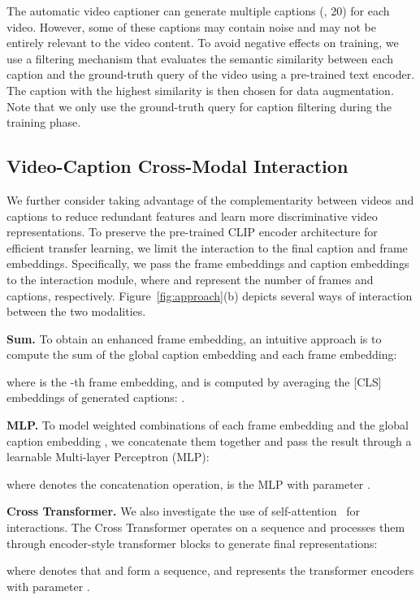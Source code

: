 \documentclass[10pt,twocolumn,letterpaper]{article}
\begin{document}
The automatic video captioner can generate multiple captions (\eg, 20) for each video. However, some of these captions may contain noise and may not be entirely relevant to the video content. To avoid negative effects on training, we use a filtering mechanism that evaluates the semantic similarity between each caption and the ground-truth query of the video using a pre-trained text encoder. The caption with the highest similarity is then chosen for data augmentation.
Note that we only use the ground-truth query for caption filtering during the training phase.


\subsection{Video-Caption Cross-Modal Interaction}\label{sec:interaction}
We further consider taking advantage of the complementarity between videos and captions to reduce redundant features and learn more discriminative video representations.
To preserve the pre-trained CLIP encoder architecture for efficient transfer learning, we limit the interaction to the final caption and frame embeddings. 
Specifically, we pass the frame embeddings  and caption embeddings  to the interaction module, where  and  represent the number of frames and captions, respectively. Figure~\ref{fig:approach}(b) depicts several ways of interaction between the two modalities.


\textbf{Sum.} To obtain an enhanced frame embedding, an intuitive approach is to compute the sum of the global caption embedding  and each frame embedding:

where  is the -th frame embedding, and  is computed by averaging the [CLS] embeddings of  generated captions: 
.



\textbf{MLP.} To model weighted combinations of each frame embedding and the global caption embedding , we concatenate them together and pass the result through a learnable Multi-layer Perceptron (MLP):

where  denotes the concatenation operation,  is the MLP with parameter .

\textbf{Cross Transformer.} We also investigate the use of self-attention~\cite{vaswani2017attention} for interactions. The Cross Transformer operates on a sequence  and processes them through  encoder-style transformer blocks to generate final representations:

where  denotes that  and  form a sequence, and  represents the transformer encoders with parameter .
\end{document}

